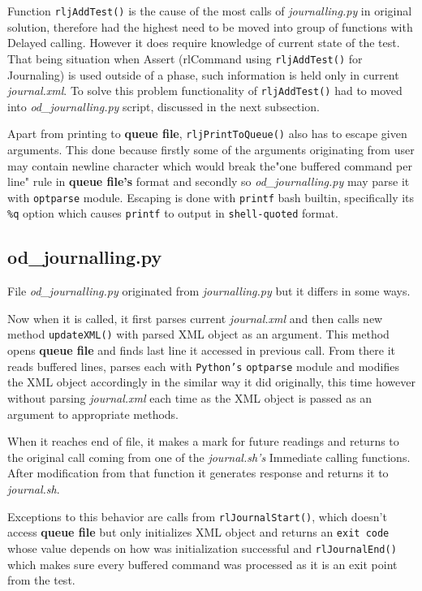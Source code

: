Function \texttt{rljAddTest()} is the cause of the most calls of \textit{journalling.py} in original solution, therefore had the highest need to be moved into group of functions with Delayed calling. However it does require knowledge of current state of the test. That being situation when Assert (rlCommand using \texttt{rljAddTest()} for Journaling) is used outside of a phase, such information is held only in current \textit{journal.xml}. To solve this problem functionality of  \texttt{rljAddTest()} had to moved into \textit{{od\_journalling.py}} script, discussed in the next subsection.

Apart from printing to \textbf{queue file}, \texttt{rljPrintToQueue()} also has to escape given arguments. This done because firstly some of the arguments originating from user may contain newline character which would break the"one buffered command per line" rule in  \textbf{queue file's} format and secondly so \textit{od\_journalling.py} may parse it with \texttt{optparse} module.
Escaping is done with \texttt{printf} bash builtin\cite{bash_builtins}, specifically its \texttt{\%q} option which causes \texttt{printf} to output in \texttt{shell-quoted} format.

\subsection{od\_journalling.py}
File \textit{od\_journalling.py} originated from \textit{journalling.py} but it differs in some ways.

Now when it is called, it first parses current \textit{journal.xml} and then calls new method \texttt{updateXML()} with parsed XML object as an argument. This method opens \textbf{queue file} and finds last line it accessed in previous call. From there it reads buffered lines, parses each with \texttt{Python's} \texttt{optparse} module and modifies the XML object accordingly in the similar way it did originally, this time however without parsing \textit{journal.xml} each time as the XML object is passed as an argument to appropriate methods. 

When it reaches end of file, it makes a mark for future readings and returns to the original call coming from one of the \textit{journal.sh's}  Immediate calling functions. After modification from that function it generates response and returns it to \textit{journal.sh}. 

Exceptions to this behavior are calls  from \texttt{rlJournalStart()}, which doesn't access \textbf{queue file} but only initializes XML object and returns an \texttt{exit code} whose value depends on how was initialization successful and \texttt{rlJournalEnd()} which makes sure every buffered command was processed as it is an exit point from the test.

